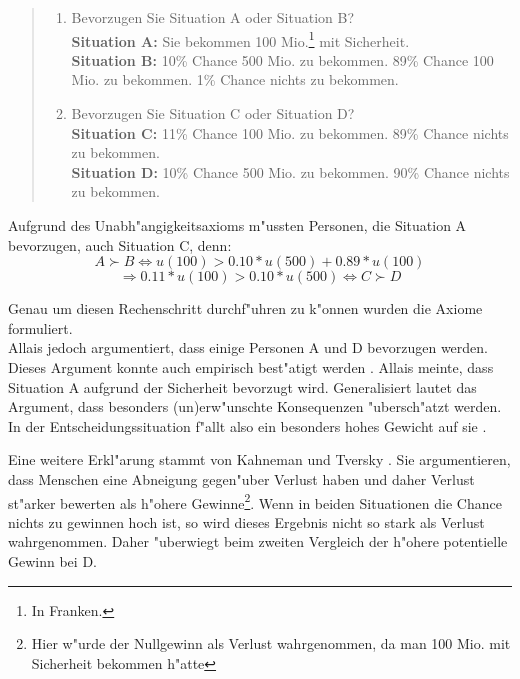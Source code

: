 \documentclass[11pt]{article}
\begin{document}
\begin{quote}
  \begin{enumerate}

  \item Bevorzugen Sie Situation A oder Situation B?\\
  \textbf{Situation A:} Sie bekommen 100 Mio.\footnote{In Franken.} mit Sicherheit.\\
  \textbf{Situation B:} 10\% Chance 500 Mio. zu bekommen. 89\% Chance 100 Mio. zu bekommen. 1\% Chance nichts zu bekommen. 
  
\item Bevorzugen Sie Situation C oder Situation D?\\
  \textbf{Situation C:} 11\% Chance 100 Mio. zu bekommen. 89\% Chance nichts zu bekommen.\\
  \textbf{Situation D:} 10\% Chance 500 Mio. zu bekommen. 90\% Chance nichts zu bekommen.
\end{enumerate}
\end{quote}
Aufgrund des Unabh"angigkeitsaxioms m"ussten Personen, die Situation A bevorzugen, auch Situation C, denn:
\begin{equation}\label{eq:6}
     A \succ  B \Leftrightarrow u(100) > 0.10* u(500) + 0.89* u(100) \tag{Situation A}
   \end{equation}
   \begin{equation}
     \label{eq:7}
   \Rightarrow 0.11*u(100) > 0.10*u(500) \Leftrightarrow C \succ D \tag{Situation B}     
   \end{equation}

   Genau um diesen Rechenschritt durchf"uhren zu k"onnen wurden die Axiome formuliert. \\
   Allais jedoch argumentiert, dass einige Personen A und D bevorzugen werden. Dieses Argument konnte auch empirisch best"atigt werden \parencites[S. 3;]{oliver2003quantitative}[S. 104]{osborne2004introduction}. Allais meinte, dass Situation A aufgrund der Sicherheit bevorzugt wird. Generalisiert lautet das Argument, dass besonders (un)erw"unschte Konsequenzen "ubersch"atzt werden. In der Entscheidungssituation f"allt also ein besonders hohes Gewicht auf sie \parencite[S. 697]{barbera2004handbook}. 
   
   Eine weitere Erkl"arung stammt von Kahneman und Tversky \parencite[1991, in ][S. 3]{oliver2003quantitative}. Sie argumentieren, dass Menschen eine Abneigung gegen"uber Verlust haben und daher Verlust st"arker bewerten als h"ohere Gewinne\footnote{Hier w"urde der Nullgewinn als Verlust wahrgenommen, da man 100 Mio. mit Sicherheit bekommen h"atte}. Wenn in beiden Situationen die Chance nichts zu gewinnen hoch ist, so wird dieses Ergebnis nicht so stark als Verlust wahrgenommen. Daher "uberwiegt beim zweiten Vergleich der h"ohere potentielle Gewinn bei D.
\end{document}

